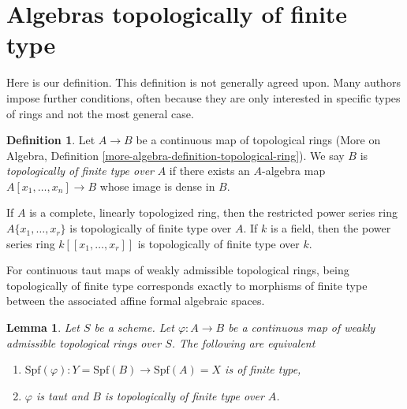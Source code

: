 \documentclass{stacks-project}
\theoremstyle{plain}
\newtheorem{lemma}[subsection]{Lemma}
\theoremstyle{definition}
\newtheorem{definition}[subsection]{Definition}
\theoremstyle{remark}
\numberwithin{equation}{subsection}
\begin{document}
\section{Algebras topologically of finite type}
\label{section-tft}

\noindent
Here is our definition. This definition is not generally agreed upon.
Many authors impose further conditions, often because they are only
interested in specific types of rings and not the most general case.

\begin{definition}
\label{definition-topologically-finite-type}
Let $A \to B$ be a continuous map of topological rings
(More on Algebra, Definition \ref{more-algebra-definition-topological-ring}).
We say $B$ is {\it topologically of finite type over} $A$ if
there exists an $A$-algebra map $A[x_1, \ldots, x_n] \to B$ whose
image is dense in $B$.
\end{definition}

\noindent
If $A$ is a complete, linearly topologized ring, then the restricted
power series ring $A\{x_1, \ldots, x_r\}$ is topologically of finite
type over $A$. If $k$ is a field, then the power series ring
$k[[x_1, \ldots, x_r]]$ is topologically of finite type over $k$.

\medskip\noindent
For continuous taut maps of weakly admissible topological rings,
being topologically of finite type corresponds exactly to morphisms
of finite type between the associated affine formal algebraic spaces.

\begin{lemma}
\label{lemma-topologically-finite-type-finite-type}
Let $S$ be a scheme. Let $\varphi : A \to B$ be a continuous map of
weakly admissible topological rings over $S$. The following
are equivalent
\begin{enumerate}
\item $\text{Spf}(\varphi) : Y = \text{Spf}(B) \to \text{Spf}(A) = X$
is of finite type,
\item $\varphi$ is taut and $B$ is topologically of finite type over $A$.
\end{enumerate}
\end{lemma}
\end{document}
